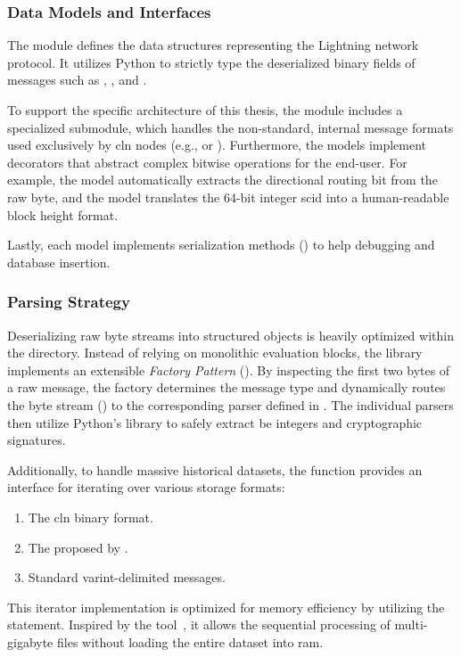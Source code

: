 \subsubsection{Data Models and Interfaces}
The  module defines the data structures representing the Lightning network protocol. 
It utilizes Python  to strictly type the deserialized binary fields of
messages such as , , and . 

To support the specific architecture of this thesis, the module includes a specialized  submodule, 
which handles the non-standard, internal message formats used exclusively by \gls{cln} nodes (e.g.,  or ).
Furthermore, the models implement  decorators that abstract complex bitwise operations for the end-user. 
For example, the  model automatically extracts the directional routing bit from the raw  byte, 
and the  model translates the 64-bit integer \gls{scid} into a human-readable block height format. 

Lastly, each model implements serialization methods () to help debugging and database insertion.

\subsubsection{Parsing Strategy}
Deserializing raw byte streams into structured objects is heavily optimized within the  directory. 
Instead of relying on monolithic evaluation blocks, the library implements an extensible \textit{Factory Pattern} (). 
By inspecting the first two bytes of a raw message, the factory determines the message type and 
dynamically routes the byte stream () to the corresponding parser defined in . 
The individual parsers then utilize Python's  library to safely extract \gls{be} integers and cryptographic signatures.

Additionally, to handle massive historical datasets, the  function provides 
an interface for iterating over various storage formats:
\begin{enumerate}
    \item The \gls{cln}  binary format.
    \item The  proposed by \citeauthor{decker_lnresearch_2020}.
    \item Standard varint-delimited messages.
\end{enumerate}
This iterator implementation is optimized for memory efficiency by utilizing the  statement. 
Inspired by the  tool~\cite{decker_lnresearch_2020}, 
it allows the sequential processing of multi-gigabyte files without loading the entire dataset into \gls{ram}.

